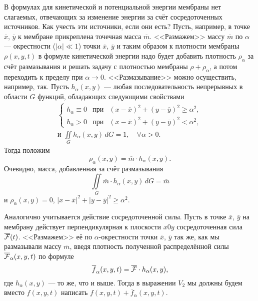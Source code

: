 В формулах для кинетической и потенциальной энергии мембраны нет слагаемых, отвечающих за изменение энергии за счёт сосредоточенных источников. Как учесть эти источники, если они есть? Пусть, например, в точке $\overline{x}$, $\overline{y}$ к мембране прикреплена точечная масса $\overline{m}$. <<Размажем>> массу $\overline{m}$ по $\alpha$ --- окрестности ($|\alpha|\ll1$) точки $\overline{x}$, $\overline{y}$ и таким образом к плотности мембраны $\rho(x,y,t)$ в формуле кинетической энергии надо будет добавить плотность $\rho_{\alpha}$ за счёт размазывания и решать задачу с плотностью мембраны $\rho+\rho_{\alpha}$, а потом переходить к пределу при $\alpha\to0$. <<Размазывание>> можно осуществить, например, так. Пусть $h_{\alpha}(x,y)$ --- любая последовательность непрерывных в области $G$ функций, обладающих следующими свойствами 
\begin{multline*}
	\left\{\begin{array}{ccc}
		h_{\alpha}\equiv0&\text{при}&(x-\overline{x})^2+(y-\overline{y})^2\geqslant\alpha^2,\\
		h_{\alpha}>0&\text{при}&(x-\overline{x})^2+(y-\overline{y})^2<\alpha^2,
	\end{array}\right.\\\text{и }\iint\limits_{G}h_{\alpha}(x,y)\,dG=1,\quad\forall\alpha>0.
\end{multline*} 
Тогда положим 
\begin{equation*}
	\rho_{\alpha}(x,y)=\overline{m}\cdot h_{\alpha}(x,y).
\end{equation*} 
Очевидно, масса, добавленная за счёт размазывания
\begin{equation*}
	\iint\limits_{G}\overline{m}\cdot h_{\alpha}(x,y)\,dG=\overline{m}
\end{equation*}
и $\rho_{\alpha}(x,y)=0$, $|x-\overline{x}|^2+|y-\overline{y}|^2\geqslant\alpha^2$.

Аналогично учитывается действие сосредоточенной силы. Пусть в точке $\overline{x}$, $\overline{y}$ на мембрану действует перпендикулярная к плоскости $x0y$ сосредоточенная сила $\overline{\mathcal{F}}(t)$. <<Размажем>> её по $\alpha$-окрестности точки $\overline{x}$, $\overline{y}$ так же, как мы размазывали массу $\overline{m}$, введя плотность полученной распределённой силы $\overline{\mathcal{F}}_{\alpha}(x,y,t)$ по формуле
\begin{equation*}
	 \overline{f}_{\alpha}(x,y,t)=\overline{\mathcal{F}}\cdot h_{\alpha}(x,y),
\end{equation*}
где $h_{\alpha}(x,y)$ --- то же, что и выше. Тогда в выражении $V_{2}$ мы должны будем вместо $f(x,y,t)$ написать $f(x,y,t)+\overline{f}_{\alpha}(x,y,t)$.

